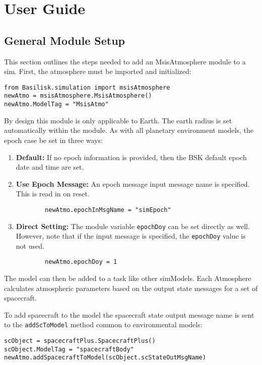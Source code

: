 
\section{User Guide}

\subsection{General Module Setup}
This section outlines the steps needed to add an MsisAtmosphere module to a sim.
First, the atmosphere must be imported and initialized:
\begin{verbatim}
from Basilisk.simulation import msisAtmosphere
newAtmo = msisAtmosphere.MsisAtmosphere()
newAtmo.ModelTag = "MsisAtmo"
\end{verbatim}

By design this module is only applicable to Earth.  The earth radius is set automatically within the module.  As with all planetary environment models, the epoch case be set in three ways:
\begin{enumerate}
	\item  {\bfseries Default:} If no epoch information is provided, then the BSK default epoch date and time are set.
	\item  {\bfseries Use Epoch Message:}  An epoch message input message name is specified.  This is read in on reset.
	\begin{verbatim}
		newAtmo.epochInMsgName = "simEpoch"
	\end{verbatim}
	\item  {\bfseries Direct Setting:} The module variable {\tt epochDoy} can be set directly as well.  However, note that if the input message is specified, the {\tt epochDoy} value is not used.
	\begin{verbatim}
		newAtmo.epochDoy = 1
	\end{verbatim}	
\end{enumerate}

The model can then be added to a task like other simModels. Each Atmosphere calculates atmospheric parameters based on the output state messages for a set of spacecraft.

To add spacecraft to the model the spacecraft state output message name is sent to the \verb|addScToModel| method common to environmental models:
\begin{verbatim}
scObject = spacecraftPlus.SpacecraftPlus()
scObject.ModelTag = "spacecraftBody"
newAtmo.addSpacecraftToModel(scObject.scStateOutMsgName)
\end{verbatim}

